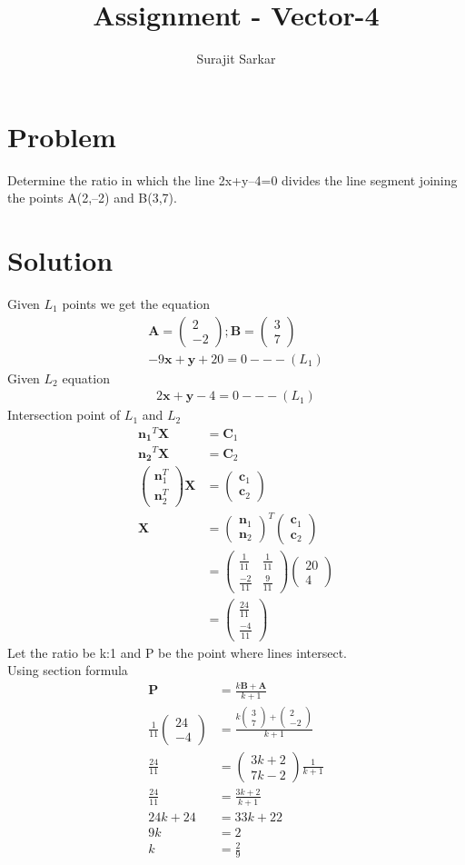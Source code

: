 \documentclass[journal,12pt,twocolumn]{IEEEtran}
\title{\mytitle}
\title{
Assignment - Vector-4
}
\author{Surajit Sarkar}
\newcommand{\myvec}[1]{\ensuremath{\begin{pmatrix}#1\end{pmatrix}}}
\let\vec\mathbf
\begin{document}
\maketitle
\tableofcontents
\bigskip
\section{\textbf{Problem}}
Determine the ratio in which the line 2x+y–4=0 divides the line segment joining the points A(2,–2) and B(3,7).
\section{\textbf{Solution}}
Given $L_1$ points we get the equation
\begin{align}
    \vec{A}=\myvec{2\\-2};
\vec{B}=\myvec{3\\7} \\
-9\vec{x}+\vec{y}+20=0 ---(L_1)
\end{align}
Given $L_2$ equation
\begin{align}
    2\vec{x}+\vec{y}-4=0 ---(L_1)
\end{align}
Intersection point of $L_1$ and $L_2$
\begin{align}
    \vec{n_1}^T\vec{X}&=\vec{C}_1\\
    \vec{n_2}^T\vec{X}&=\vec{C}_2\\
    \myvec{\vec{n}_1^T\\\vec{n}_2^T}\vec{X}&=\myvec{\vec{c}_1\\ \vec{c}_2}\\
    \vec{X}&=\myvec{\vec{n}_1\\\vec{n}_2}^T\myvec{\vec{c}_1\\\vec{c}_2}\\
    &=\myvec{\frac{1}{11}&\frac{1}{11}\\ \frac{-2}{11}&\frac{9}{11}} \myvec{20\\4}\\
    &=\myvec{\frac{24}{11}\\ \frac{-4}{11}}
\end{align}
Let the ratio be k:1 and P be the point where lines intersect.\\
Using section formula
\begin{align}
\vec{P}&=\frac{k\vec{B}+\vec{A}}{k+1}\\
\frac{1}{11}\myvec{24\\-4}&=\frac{k\myvec{3\\7}+\myvec{2\\-2}}{k+1}\\
\frac{24}{11}&=\myvec{3k+2\\7k-2}\frac{1}{k+1}\\
\frac{24}{11}&=\frac{3k+2}{k+1}\\
24k+24&=33k+22\\
9k&=2\\
k&=\frac{2}{9}
\end{align}
\end{document}
